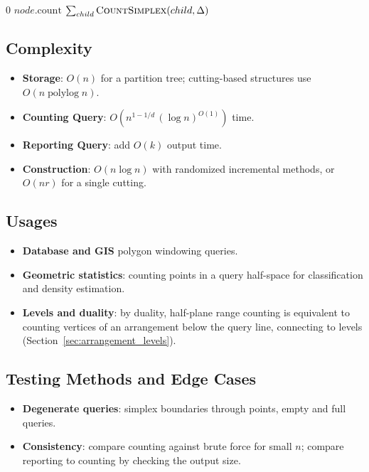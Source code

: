 \begin{algorithm}[ht]
\label{alg:partition_tree}
\caption{Simplex Range Counting with a Partition Tree}
\begin{algorithmic}[1]
  \State {}
    \State \Return $0$
  \EndIf
    \State \Return $node.\text{count}$
  \EndIf
  \State \Return $\sum_{child} \textsc{CountSimplex}(child, \Delta)$
\EndFunction
\end{algorithmic}
\end{algorithm}

\subsection{Complexity}
\begin{itemize}
    \item \textbf{Storage}: $O(n)$ for a partition tree; cutting-based
      structures use $O(n \operatorname{polylog} n)$.
    \item \textbf{Counting Query}: $O(n^{1-1/d}\,(\log n)^{O(1)})$ time.
    \item \textbf{Reporting Query}: add $O(k)$ output time.
    \item \textbf{Construction}: $O(n \log n)$ with randomized incremental
      methods, or $O(nr)$ for a single cutting.
\end{itemize}

\subsection{Usages}
\begin{itemize}
    \item \textbf{Database and GIS} polygon windowing queries.
    \item \textbf{Geometric statistics}: counting points in a query half-space
      for classification and density estimation.
    \item \textbf{Levels and duality}: by duality, half-plane range counting
      is equivalent to counting vertices of an arrangement below the query
      line, connecting to levels (Section~\ref{sec:arrangement_levels}).
\end{itemize}

\subsection{Testing Methods and Edge Cases}
\begin{itemize}
    \item \textbf{Degenerate queries}: simplex boundaries through points,
      empty and full queries.
    \item \textbf{Consistency}: compare counting against brute force for small
      $n$; compare reporting to counting by checking the output size.
\end{itemize}

